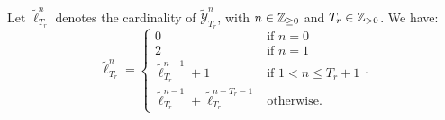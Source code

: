 \documentclass{article}
\begin{document}
    
    
    \begin{theorem}  \label{thm:1-recursion}
      Let $\tilde{\ell}_{T_r}^n$ denotes the cardinality of $\tilde{\mathcal{Y}}_{T_r}^n$, with $n \in \mathbb{Z}_{\geq 0}$ and $T_r \in \mathbb{Z}_{> 0}$. We have:
      \begin{equation}
        \tilde{\ell}_{T_r}^{n} = 
        \left\{
          \begin{array}{ll}
            0 & \mbox{if } n = 0 \\
            2 & \mbox{if } n = 1 \\
            \tilde{\ell}_{T_r}^{n-1} + 1 & \mbox{if } 1 < n \leq T_r + 1 \\
            \tilde{\ell}_{T_r}^{n-1} + \tilde{\ell}_{T_r}^{n-T_r-1} & \mbox{otherwise}.
          \end{array}
        \right..
      \end{equation}
    \end{theorem}
    
\end{document}
